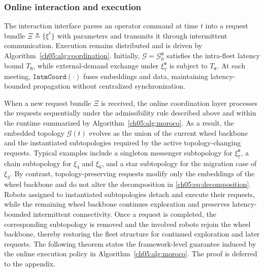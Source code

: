 \subsubsection{Online interaction and execution}
\label{ch05:subsubsec:interaction}

The interaction interface parses an operator command at time \(t\) into a
request bundle \(\Xi \triangleq \{\xi^{\ell}\}\) with parameters and transmits
it through intermittent communication. Execution remains distributed and is
driven by Algorithm~\ref{ch05:alg:coordination}. Initially,
\(\mathcal{G}=\mathcal{G}_{0}^{\texttt{w}}\) satisfies the intra-fleet latency
bound \(T_{\texttt{h}}\), while external-demand exchange under
\(\xi_7^{\texttt{e}}\) is subject to \(T_{\texttt{e}}\). At each meeting,
\(\texttt{IntmCoord}(\cdot)\) fuses embeddings and data, maintaining
latency-bounded propagation without centralized synchronization.

When a new request bundle \(\Xi\) is received, the online
coordination layer processes the requests sequentially under the
admissibility rule described above and within the runtime summarized
by Algorithm~\ref{ch05:alg:moroco}. As a result, the embedded topology
\(\mathcal{G}(t)\) evolves as the union of the current wheel
backbone and the instantiated subtopologies required by the active
topology-changing requests. Typical examples include a singleton
messenger subtopology for \(\xi_7^{\texttt{e}}\), a chain subtopology for
\(\xi_4\) and \(\xi_6\), and a star subtopology for the migration
case of \(\xi_3\). By contrast, topology-preserving requests modify
only the embeddings of the wheel backbone and do not alter the
decomposition in \eqref{ch05:eq:decomposition}. Robots assigned to
instantiated subtopologies detach and execute their requests, while the
remaining wheel backbone continues exploration and preserves
latency-bounded intermittent connectivity. Once a request is
completed, the corresponding subtopology is removed and the involved
robots rejoin the wheel backbone, thereby restoring the fleet
structure for continued exploration and later requests.
The following theorem states the framework-level guarantee induced by
the online execution policy in Algorithm~\ref{ch05:alg:moroco}. The proof
is deferred to the appendix.

